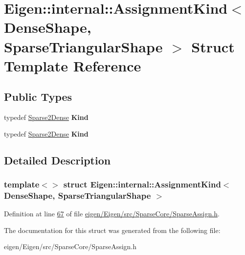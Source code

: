 \hypertarget{struct_eigen_1_1internal_1_1_assignment_kind_3_01_dense_shape_00_01_sparse_triangular_shape_01_4}{}\section{Eigen\+:\+:internal\+:\+:Assignment\+Kind$<$ Dense\+Shape, Sparse\+Triangular\+Shape $>$ Struct Template Reference}
\label{struct_eigen_1_1internal_1_1_assignment_kind_3_01_dense_shape_00_01_sparse_triangular_shape_01_4}
\subsection*{Public Types}
\begin{DoxyCompactItemize}
\item 
\mbox{\label{struct_eigen_1_1internal_1_1_assignment_kind_3_01_dense_shape_00_01_sparse_triangular_shape_01_4_a7f749cee63493922e4c4a9c9d8e8cb84}} 
typedef \hyperlink{struct_eigen_1_1internal_1_1_sparse2_dense}{Sparse2\+Dense} {\bfseries Kind}
\item 
\mbox{\label{struct_eigen_1_1internal_1_1_assignment_kind_3_01_dense_shape_00_01_sparse_triangular_shape_01_4_a7f749cee63493922e4c4a9c9d8e8cb84}} 
typedef \hyperlink{struct_eigen_1_1internal_1_1_sparse2_dense}{Sparse2\+Dense} {\bfseries Kind}
\end{DoxyCompactItemize}


\subsection{Detailed Description}
\subsubsection*{template$<$$>$\newline
struct Eigen\+::internal\+::\+Assignment\+Kind$<$ Dense\+Shape, Sparse\+Triangular\+Shape $>$}



Definition at line \hyperlink{eigen_2_eigen_2src_2_sparse_core_2_sparse_assign_8h_source_l00067}{67} of file \hyperlink{eigen_2_eigen_2src_2_sparse_core_2_sparse_assign_8h_source}{eigen/\+Eigen/src/\+Sparse\+Core/\+Sparse\+Assign.\+h}.



The documentation for this struct was generated from the following file\+:\begin{DoxyCompactItemize}
\item 
eigen/\+Eigen/src/\+Sparse\+Core/\+Sparse\+Assign.\+h\end{DoxyCompactItemize}
